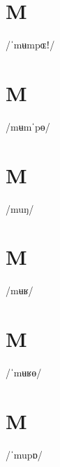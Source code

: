\documentclass[10pt,a4paper,twoside]{book}
\begin{document}
\section*{M}

\begin{multicols}{3}
 {/ˈmʉmpɶǃ/} {}
\end{multicols}

\section*{M}

\begin{multicols}{3}
 {/mʉmˈpɵ/} {}
\end{multicols}

\section*{M}

\begin{multicols}{3}
 {/muŋ/} {}
\end{multicols}

\section*{M}

\begin{multicols}{3}
 {/mʉʁ/} {}
\end{multicols}

\section*{M}

\begin{multicols}{3}
 {/ˈmʉʁɵ/} {}
\end{multicols}

\section*{M}

\begin{multicols}{3}
 {/ˈmupɒ/} {}
\end{multicols}
\end{document}
